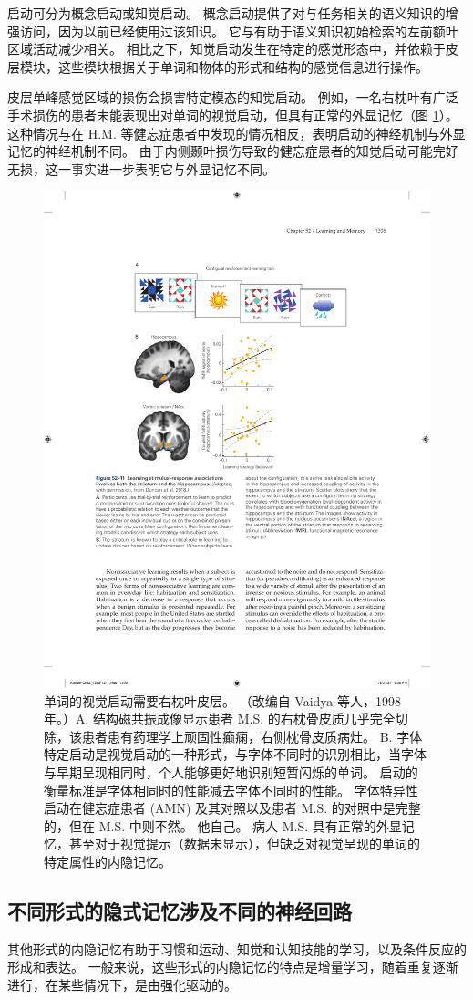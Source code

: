 启动可分为概念启动或知觉启动。 概念启动提供了对与任务相关的语义知识的增强访问，因为以前已经使用过该知识。 它与有助于语义知识初始检索的左前额叶区域活动减少相关。 相比之下，知觉启动发生在特定的感觉形态中，并依赖于皮层模块，这些模块根据关于单词和物体的形式和结构的感觉信息进行操作。

皮层单峰感觉区域的损伤会损害特定模态的知觉启动。 例如，一名右枕叶有广泛手术损伤的患者未能表现出对单词的视觉启动，但具有正常的外显记忆（图 \ref{fig:52_10}）。 这种情况与在 H.M. 等健忘症患者中发现的情况相反，表明启动的神经机制与外显记忆的神经机制不同。 由于内侧颞叶损伤导致的健忘症患者的知觉启动可能完好无损，这一事实进一步表明它与外显记忆不同。

\begin{figure}[htbp]
	\centering
	\includegraphics[width=0.45\linewidth]{chap52/fig_52_10}
	\caption{单词的视觉启动需要右枕叶皮层。 （改编自 Vaidya 等人，1998 年。）A. 结构磁共振成像显示患者 M.S. 的右枕骨皮质几乎完全切除，该患者患有药理学上顽固性癫痫，右侧枕骨皮质病灶。 B. 字体特定启动是视觉启动的一种形式，与字体不同时的识别相比，当字体与早期呈现相同时，个人能够更好地识别短暂闪烁的单词。 启动的衡量标准是字体相同时的性能减去字体不同时的性能。 字体特异性启动在健忘症患者 (AMN) 及其对照以及患者 M.S. 的对照中是完整的，但在 M.S. 中则不然。 他自己。 病人 M.S. 具有正常的外显记忆，甚至对于视觉提示（数据未显示），但缺乏对视觉呈现的单词的特定属性的内隐记忆。}
	\label{fig:52_10}
\end{figure}

\subsection{不同形式的隐式记忆涉及不同的神经回路}
其他形式的内隐记忆有助于习惯和运动、知觉和认知技能的学习，以及条件反应的形成和表达。 一般来说，这些形式的内隐记忆的特点是增量学习，随着重复逐渐进行，在某些情况下，是由强化驱动的。

